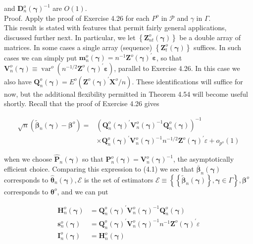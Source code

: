 \documentclass[10pt]{article}
\begin{document}
and $\mathbf{D}_{n}^{o}(\boldsymbol{\gamma})^{-1}$ are $O(1)$.\\
Proof. Apply the proof of Exercise 4.26 for each $P^{o}$ in $\mathcal{P}$ and $\gamma$ in $\Gamma$.\\
This result is stated with features that permit fairly general applications, discussed further next. In particular, we let $\left\{\mathbf{Z}_{n t}^{o}(\boldsymbol{\gamma})\right\}$ be a double array of matrices. In some cases a single array (sequence) $\left\{\mathbf{Z}_{t}^{o}(\boldsymbol{\gamma})\right\}$ suffices. In such cases we can simply put $\mathbf{m}_{n}^{o}(\boldsymbol{\gamma})=n^{-1} \mathbf{Z}^{o}(\boldsymbol{\gamma})^{\prime} \boldsymbol{\varepsilon}$, so that $\mathbf{V}_{n}^{o}(\boldsymbol{\gamma}) \equiv \operatorname{var}^{o}\left(n^{-1 / 2} \mathbf{Z}^{o}(\boldsymbol{\gamma})^{\prime} \boldsymbol{\varepsilon}\right)$, parallel to Exercise 4.26. In this case we also have $\mathbf{Q}_{n}^{o}(\boldsymbol{\gamma})=E^{o}\left(\mathbf{Z}^{o}(\boldsymbol{\gamma})^{\prime} \mathbf{X}^{o} / n\right)$. These identifications will suffice for now, but the additional flexibility permitted in Theorem 4.54 will become useful shortly. Recall that the proof of Exercise 4.26 gives

$$
\begin{aligned}
\sqrt{n}\left(\tilde{\boldsymbol{\beta}}_{n}(\boldsymbol{\gamma})-\boldsymbol{\beta}^{o}\right)= & \left(\mathbf{Q}_{n}^{o}(\boldsymbol{\gamma})^{\prime} \mathbf{V}_{n}^{o}(\boldsymbol{\gamma})^{-1} \mathbf{Q}_{n}^{o}(\boldsymbol{\gamma})\right)^{-1} \\
& \times \mathbf{Q}_{n}^{o}(\boldsymbol{\gamma})^{\prime} \mathbf{V}_{n}^{o}(\boldsymbol{\gamma})^{-1} n^{-1 / 2} \mathbf{Z}^{o}(\boldsymbol{\gamma})^{\prime} \varepsilon+o_{p^{o}}(1)
\end{aligned}
$$

when we choose $\hat{\mathbf{P}}_{n}(\boldsymbol{\gamma})$ so that $\mathbf{P}_{n}^{o}(\boldsymbol{\gamma})=\mathbf{V}_{n}^{o}(\boldsymbol{\gamma})^{-1}$, the asymptotically efficient choice. Comparing this expression to (4.1) we see that $\overline{\boldsymbol{\beta}}_{n}(\boldsymbol{\gamma})$ corresponds to $\hat{\boldsymbol{\theta}}_{n}(\boldsymbol{\gamma}), \mathcal{E}$ is the set of estimators $\mathcal{E} \equiv\left\{\left\{\tilde{\boldsymbol{\beta}}_{n}(\boldsymbol{\gamma})\right\}, \boldsymbol{\gamma} \in \Gamma\right\}, \boldsymbol{\beta}^{o}$ corresponds to $\boldsymbol{\theta}^{o}$, and we can put

$$
\begin{aligned}
\mathbf{H}_{n}^{o}(\boldsymbol{\gamma}) & =\mathbf{Q}_{n}^{o}(\boldsymbol{\gamma})^{\prime} \mathbf{V}_{n}^{o}(\boldsymbol{\gamma})^{-1} \mathbf{Q}_{n}^{o}(\boldsymbol{\gamma}) \\
\mathbf{s}_{n}^{o}(\boldsymbol{\gamma}) & =\mathbf{Q}_{n}^{o}(\boldsymbol{\gamma})^{\prime} \mathbf{V}_{n}^{o}(\boldsymbol{\gamma})^{-1} n^{-1} \mathbf{Z}^{o}(\boldsymbol{\gamma})^{\prime} \varepsilon \\
\mathbf{I}_{n}^{o}(\boldsymbol{\gamma}) & =\mathbf{H}_{n}^{o}(\boldsymbol{\gamma})
\end{aligned}
$$
\end{document}

